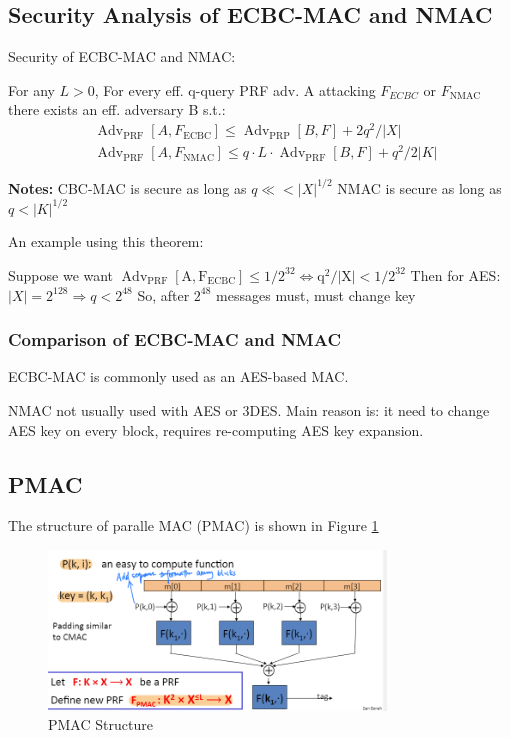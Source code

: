 \subsection{Security Analysis of ECBC-MAC and NMAC}


\begin{theorem}  Security of ECBC-MAC and NMAC:

    For any $L>0$,
    For every eff. q-query PRF adv. A attacking $F_{E C B C}$ or $F_{\text {NMAC }}$ there exists an eff. adversary B s.t.:
    $$
    \begin{aligned}
    &\operatorname{Adv}_{\mathrm{PRF}}\left[A, F_{\mathrm{ECBC}}\right] \leq \operatorname{Adv}_{\mathrm{PRP}}[B, F]+2 q^{2} /|X| \\
    &\operatorname{Adv}_{\mathrm{PRF}}\left[A, F_{\mathrm{NMAC}}\right] \leq q \cdot L \cdot \operatorname{Adv}_{\mathrm{PRF}}[B, F]+q^{2} / 2|K|
    \end{aligned}
    $$

\end{theorem}

\textbf{Notes:} CBC-MAC is secure as long as $q \ll<|X|^{1 / 2}$ NMAC is secure as long as $q<|K|^{1 / 2}$

An example using this theorem:

Suppose we want $\operatorname{Adv}_{\mathrm{PRF}}\left[\mathrm{A}, \mathrm{F}_{\mathrm{ECBC}}\right] \leq 1 / 2^{32} \Leftrightarrow \mathrm{q}^{2} /|\mathrm{X}|<1 / 2^{32}$
Then for AES: $|X|=2^{128} \Rightarrow q<2^{48}$
So, after $2^{48}$ messages must, must change key\

\subsubsection{Comparison of ECBC-MAC and NMAC}

ECBC-MAC is commonly used as an AES-based MAC.

NMAC not usually used with AES or 3DES. Main reason is: it need to change AES key on every block, requires re-computing AES key expansion.


\subsection{PMAC}

The structure of paralle MAC (PMAC) is shown in Figure \ref{fig: Lecture 4: PMAC Structure}

\begin{figure}[h]
    \centering
    \includegraphics[width=0.8\textwidth]{Stanford_Crypto_1/fig/04_Integrity/PMAC_Structure.png}
    \caption{PMAC Structure}
    \label{fig: Lecture 4: PMAC Structure}
\end{figure}


